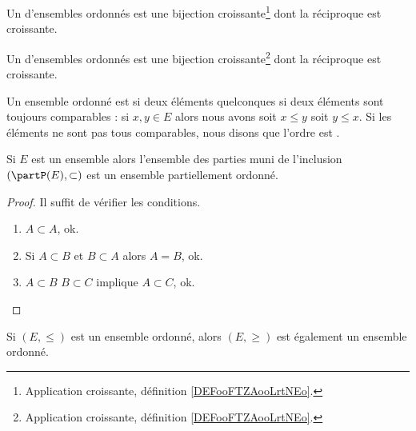 \begin{definition}	\label{DEFooQEIAooGzzdiu}
	Un  d'ensembles ordonnés est une bijection croissante\footnote{Application croissante, définition \ref{DEFooFTZAooLrtNEo}.} dont la réciproque est croissante.
\end{definition}

\begin{definition}	\label{DEFooQEIAooGzzdiu}
	Un  d'ensembles ordonnés est une bijection croissante\footnote{Application croissante, définition \ref{DEFooFTZAooLrtNEo}.} dont la réciproque est croissante.
\end{definition}

\begin{definition}      \label{DEFooVGYQooUhUZGr}
	Un ensemble ordonné est  si deux éléments quelconques si deux éléments sont toujours comparables : si \( x,y\in E\) alors nous avons soit \( x\leq y\) soit \( y\leq x\). Si les éléments ne sont pas tous comparables, nous disons que l'ordre est .
\end{definition}


\begin{lemma}	\label{LEMooZUAZooFlziuO}
	Si \( E\) est un ensemble alors l'ensemble des parties muni de l'inclusion \( (\partP(E),\subset)\) est un ensemble partiellement ordonné.
\end{lemma}

\begin{proof}
	Il suffit de vérifier les conditions.
	\begin{enumerate}
		\item
		      \( A\subset A\), ok.
		\item
		      Si \( A\subset B\) et \( B\subset A\) alors \( A=B\), ok.
		\item
		      \( A\subset B\) \( B\subset C\) implique \( A\subset C\), ok.
	\end{enumerate}
\end{proof}

\begin{proposition}	\label{PROPooNPLNooTqXVYz}
	Si \( (E,\leq )\) est un ensemble ordonné, alors \( (E,\geq)\) est également un ensemble ordonné.
\end{proposition}


